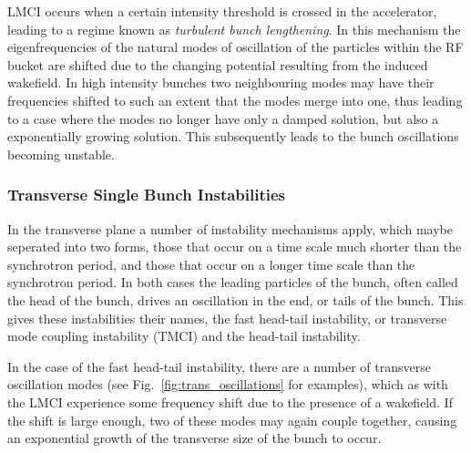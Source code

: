 LMCI occurs when a certain intensity threshold is crossed in the accelerator, leading to a regime known as \emph{turbulent bunch lengthening}. In this mechanism the eigenfrequencies of the natural modes of oscillation of the particles within the RF bucket are shifted due to the changing potential resulting from the induced wakefield. In high intensity bunches two neighbouring modes may have their frequencies shifted to such an extent that the modes merge into one, thus leading to a case where the modes no longer have only a damped solution, but also a exponentially growing solution. This subsequently leads to the bunch oscillations becoming unstable.

\subsubsection{Transverse Single Bunch Instabilities}

In the transverse plane a number of instability mechanisms apply, which maybe seperated into two forms, those that occur on a time scale much shorter than the synchrotron period, and those that occur on a longer time scale than the synchrotron period. In both cases the leading particles of the bunch, often called the head of the bunch, drives an oscillation in the end, or tails of the bunch. This gives these instabilities their names, the fast head-tail instability, or transverse mode coupling instability (TMCI) and the head-tail instability.

In the case of the fast head-tail instability, there are a number of transverse oscillation modes (see Fig.~\ref{fig:trans_oscillations} for examples), which as with the LMCI experience some frequency shift due to the presence of a wakefield. If the shift is large enough, two of these modes may again couple together, causing an exponential growth of the transverse size of the bunch to occur.

